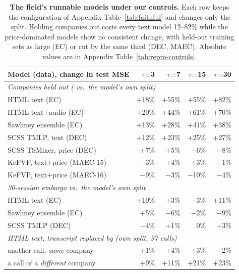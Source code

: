 \begin{table}[t]
\centering
\scriptsize
\setlength{\tabcolsep}{3pt}
\begin{tabular}{lrrrr}
\toprule
Model (data), change in test MSE & $\tau$=3 & $\tau$=7 & $\tau$=15 & $\tau$=30 \\
\midrule
\multicolumn{5}{l}{\textit{Companies held out (\tickerdisjoint{} vs.\ the model's own split)}}\\
HTML text (EC) & +18\% & +55\% & +55\% & +82\% \\
HTML text$+$audio (EC) & +20\% & +44\% & +61\% & +70\% \\
Sawhney ensemble (EC) & +13\% & +28\% & +41\% & +38\% \\
SCSS TMLP, text (DEC) & +12\% & +23\% & +25\% & +27\% \\
SCSS TSMixer, price (DEC) & +7\% & +5\% & $-$6\% & $-$8\% \\
KeFVP, text$+$price (MAEC-15) & $-$3\% & +4\% & +3\% & $-$1\% \\
KeFVP, text$+$price (MAEC-16) & $-$9\% & $-$3\% & $-$10\% & $-$4\% \\
\midrule
\multicolumn{5}{l}{\textit{30-session embargo vs.\ the model's own split}}\\
HTML text (EC) & +10\% & +3\% & $-$3\% & +11\% \\
Sawhney ensemble (EC) & +5\% & $-$6\% & $-$2\% & $-$9\% \\
SCSS TMLP (DEC) & $-$4\% & +1\% & 0\% & +3\% \\
\midrule
\multicolumn{5}{l}{\textit{HTML text, transcript replaced by (own split, 97 calls)}}\\
another call, \emph{same} company & +1\% & +4\% & +3\% & +2\% \\
a call of a \emph{different} company & +9\% & +11\% & +21\% & +23\% \\
\bottomrule
\end{tabular}
\caption{\textbf{The field's runnable models under our controls.}
Each row keeps the configuration of Appendix Table~\ref{tab:faithful}
and changes only the split. Holding companies out costs every text model 12--82\%
while the price-dominated models show no consistent change, with held-out training sets as
large (EC) or cut by the same third (DEC, MAEC). Absolute values are in Appendix
Table~\ref{tab:repro-controls}.}
\label{tab:repro-main}
\end{table}
